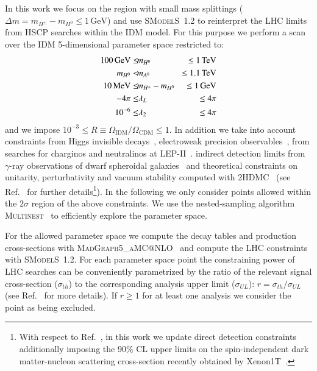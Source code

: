 \documentclass[preprint,number,sort&compress,twocolumn,3p]{elsstyarticle}
\newcommand{\Hn}{{H^0}}
\newcommand{\Hp}{{H^\pm}}
\def\bea{\begin{eqnarray}}
\def\eea{\end{eqnarray}}
\newcommand{\MEV}{\ensuremath{\,\textnormal{MeV}}}
\newcommand{\GEV}{\ensuremath{\,\textnormal{GeV}}}
\newcommand{\TEV}{\ensuremath{\,\textnormal{TeV}}}
\newcommand{\smo}{\textsc{SModelS}}
\begin{document}
In this work we focus on the region with small mass splittings ($\Delta m = m_{\Hp} - m_{\Hn} \le1\,\text{GeV}$) and use \smo~1.2 to reinterpret the LHC limits from HSCP searches within the IDM model. 
For this purpose we perform a scan over the IDM 5-dimensional parameter space restricted to:
\bea
100 \GEV \le & \!m_{H^0} \!&\le1\TEV \nonumber \\
m_{H^0} < & \!m_{A^0} \!& \le1.1\TEV \nonumber \\
10\MEV \le & \!m_{H^\pm} -m_{H^0}\!& \le1\GEV \nonumber \\
-4\pi \le &  \lambda_L  & \le 4\pi  \\
10^{-6} \le &  \lambda_2  & \le 4\pi \nonumber
\eea
and we impose $10^{-3} \leq R \equiv \Omega_{\text{IDM}}/\Omega_{\text{CDM}} \leq 1$.
In addition we take into account constraints from Higgs invisible decays~\cite{Aad:2015pla}, 
electroweak precision observables~\cite{Baak:2014ora,Eriksson:2009ws}, from searches for charginos and neutralinos at LEP-II~\cite{Pierce:2007ut,Lundstrom:2008ai}.
indirect detection limits from  $\gamma$-ray observations of dwarf spheroidal galaxies~\cite{Fermi-LAT:2016uux}
and theoretical constraints on unitarity, perturbativity and vacuum stability computed with \textsc{2HDMC}~\cite{Eriksson:2009ws} (see Ref.~\cite{Eiteneuer:2017hoh} for further details\footnote{With respect to Ref.~\cite{Eiteneuer:2017hoh}, in this work we update 
    direct detection constraints additionally imposing the 90\% CL upper limits on the spin-independent
    dark matter-nucleon scattering cross-section recently obtained by Xenon1T~\cite{Aprile:2018dbl}.
}).
In the following we only consider points allowed within the $2\sigma$ region of the above constraints.
We use the nested-sampling algorithm \textsc{Multinest}~\cite{Feroz:2008xx,Feroz:2013hea} 
to efficiently explore the parameter space. 

For the allowed parameter space we compute the decay tables and production cross-sections
with \textsc{MadGraph5\_aMC@NLO}~\cite{Alwall:2014hca} and compute the LHC constraints with \smo~1.2. 
For each parameter space point the constraining power of LHC
searches can be conveniently parametrized by the ratio of the relevant signal cross-section ($\sigma_{th}$) to the corresponding analysis upper limit ($\sigma_{UL}$): $r = \sigma_{th}/\sigma_{UL}$ (see Ref.~\cite{Ambrogi:2017neo} for more details).
If $r \geq 1$ for at least one analysis we consider the point as being excluded.
\end{document}
